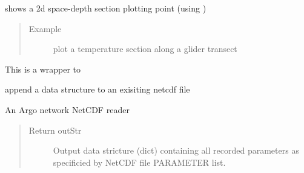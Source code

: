 \documentclass[letterpaper,10pt,english]{sphinxmanual}
\begin{document}
\begin{fulllineitems}
\begin{fulllineitems}
\end{fulllineitems}


\begin{fulllineitems}
\label{altimetry.data:altimetry.data.hydro_data.plot_transect}
shows a 2d space-depth section plotting point (using )
\begin{quote}\begin{description}
\item[{Example}] \leavevmode
plot a temperature section along a glider transect

\end{description}\end{quote}

\end{fulllineitems}


\begin{fulllineitems}
\label{altimetry.data:altimetry.data.hydro_data.pop}
This is a wrapper to {\hyperref[altimetry.data:altimetry.data.hydro_data.delete_Variable]{\emph{}}}

\end{fulllineitems}


\begin{fulllineitems}
\label{altimetry.data:altimetry.data.hydro_data.push_nc}
append a data structure to an exisiting netcdf file

\end{fulllineitems}


\begin{fulllineitems}
\label{altimetry.data:altimetry.data.hydro_data.read_ArgoNC}
An Argo network NetCDF reader
\begin{quote}\begin{description}
\item[{Return outStr}] \leavevmode
Output data stricture (dict) containing all recorded parameters as specificied by NetCDF file PARAMETER list.


\end{description}
\end{quote}
\end{fulllineitems}
\end{fulllineitems}
\end{document}
